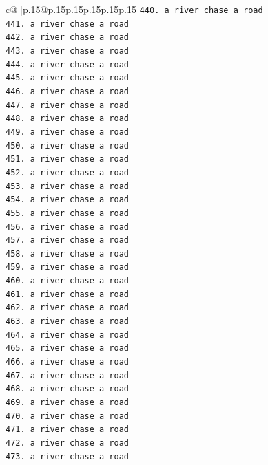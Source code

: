 \documentclass{article}
\begin{document}
{\begin{supertabular}{c@{$\;$}|p{.15\linewidth}@{}p{.15\linewidth}p{.15\linewidth}p{.15\linewidth}p{.15\linewidth}p{.15\linewidth}}
{{{\texttt{440. a river chase a road} \\
\texttt{441. a river chase a road} \\
\texttt{442. a river chase a road} \\
\texttt{443. a river chase a road} \\
\texttt{444. a river chase a road} \\
\texttt{445. a river chase a road} \\
\texttt{446. a river chase a road} \\
\texttt{447. a river chase a road} \\
\texttt{448. a river chase a road} \\
\texttt{449. a river chase a road} \\
\texttt{450. a river chase a road} \\
\texttt{451. a river chase a road} \\
\texttt{452. a river chase a road} \\
\texttt{453. a river chase a road} \\
\texttt{454. a river chase a road} \\
\texttt{455. a river chase a road} \\
\texttt{456. a river chase a road} \\
\texttt{457. a river chase a road} \\
\texttt{458. a river chase a road} \\
\texttt{459. a river chase a road} \\
\texttt{460. a river chase a road} \\
\texttt{461. a river chase a road} \\
\texttt{462. a river chase a road} \\
\texttt{463. a river chase a road} \\
\texttt{464. a river chase a road} \\
\texttt{465. a river chase a road} \\
\texttt{466. a river chase a road} \\
\texttt{467. a river chase a road} \\
\texttt{468. a river chase a road} \\
\texttt{469. a river chase a road} \\
\texttt{470. a river chase a road} \\
\texttt{471. a river chase a road} \\
\texttt{472. a river chase a road} \\
\texttt{473. a river chase a road} \\
}}}
\end{supertabular}}
\end{document}
